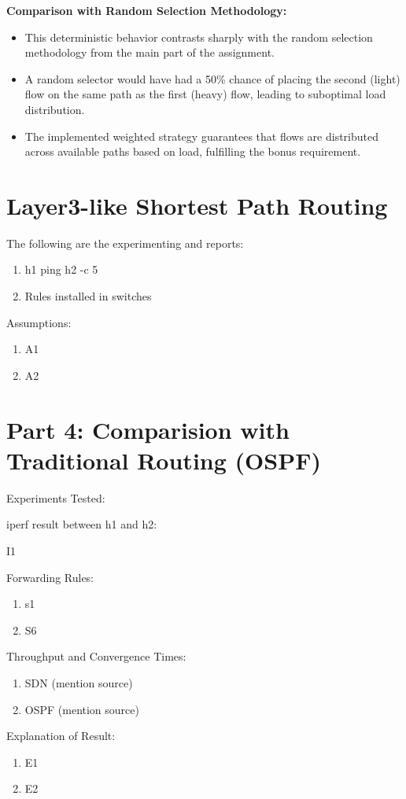 \documentclass[12pt]{article}
\begin{document}
\noindent \textbf{Comparison with Random Selection Methodology:}
\begin{itemize}
    \item This deterministic behavior contrasts sharply with the random selection methodology from the main part of the assignment. 
    \item A random selector would have had a 50\% chance of placing the second (light) flow on the same path as the first (heavy) flow, leading to suboptimal load distribution. 
    \item The implemented weighted strategy guarantees that flows are distributed across available paths based on load, fulfilling the bonus requirement.
    
\end{itemize}

\section{Layer3-like Shortest Path Routing}

The following are the experimenting and reports:

\begin{enumerate}
    \item h1 ping h2 -c 5
    \item Rules installed in switches
\end{enumerate}

Assumptions:
\begin{enumerate}
    \item A1
    \item A2
\end{enumerate}


\section{Part 4: Comparision with Traditional Routing (OSPF)}

Experiments Tested:

iperf result between h1 and h2:

I1

Forwarding Rules:
\begin{enumerate}
    \item s1
    \item S6
\end{enumerate}

Throughput and Convergence Times:
\begin{enumerate}
    \item SDN (mention source)
    \item OSPF (mention source)
\end{enumerate}

Explanation of Result:
\begin{enumerate}
    \item E1 
    \item E2
\end{enumerate}

\end{document}

